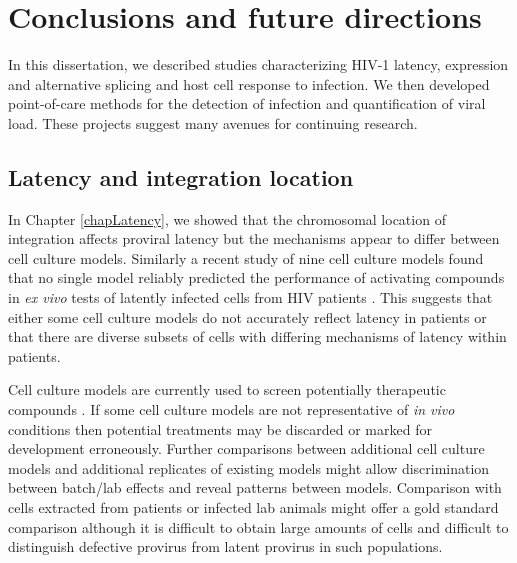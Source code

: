 \documentclass[../sherrill-Mix_thesis.tex]{subfiles}
\begin{document}
\chapter{Conclusions and future directions}
\graphicspath{{im/}{conclusion/im/}}

In this dissertation, we described studies characterizing HIV-1 latency, expression and alternative splicing and host cell response to infection. We then developed point-of-care methods for the detection of infection and quantification of viral load. These projects suggest many avenues for continuing research.


\section{Latency and integration location}
	In Chapter \ref{chapLatency}, we showed that the chromosomal location of integration affects proviral latency but the mechanisms appear to differ between cell culture models. Similarly a recent study of nine cell culture models found that no single model reliably predicted the performance of activating compounds in \textit{ex vivo} tests of latently infected cells from HIV patients \citep{Spina2013}. This suggests that either some cell culture models do not accurately reflect latency in patients or that there are diverse subsets of cells with differing mechanisms of latency within patients. 

	Cell culture models are currently used to screen potentially therapeutic compounds \citep{Xing2011,Spina2013}. If some cell culture models are not representative of \textit{in vivo} conditions then potential treatments may be discarded or marked for development erroneously. Further comparisons between additional cell culture models and additional replicates of existing models might allow discrimination between batch/lab effects and reveal patterns between models. Comparison with cells extracted from patients or infected lab animals might offer a gold standard comparison although it is difficult to obtain large amounts of cells and difficult to distinguish defective provirus from latent provirus in such populations. %
\end{document}
